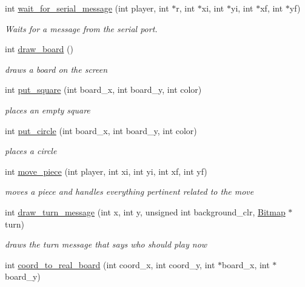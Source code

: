 \begin{DoxyCompactItemize}
int \hyperlink{group___checkers_ga17180b891d06475062d87e08d01af278}{wait\+\_\+for\+\_\+serial\+\_\+message} (int player, int $\ast$r, int $\ast$xi, int $\ast$yi, int $\ast$xf, int $\ast$yf)
\begin{DoxyCompactList}\small\item\em Waits for a message from the serial port. \end{DoxyCompactList}\item 
int \hyperlink{group___checkers_gaa6a495a94944bda567df909f84c62396}{draw\+\_\+board} ()
\begin{DoxyCompactList}\small\item\em draws a board on the screen \end{DoxyCompactList}\item 
int \hyperlink{group___checkers_gaf3fd6677c55727d50220875a0031230b}{put\+\_\+square} (int board\+\_\+x, int board\+\_\+y, int color)
\begin{DoxyCompactList}\small\item\em places an empty square \end{DoxyCompactList}\item 
int \hyperlink{group___checkers_ga1d2d36062ce4e9fcdba43dfdc59215d0}{put\+\_\+circle} (int board\+\_\+x, int board\+\_\+y, int color)
\begin{DoxyCompactList}\small\item\em places a circle \end{DoxyCompactList}\item 
int \hyperlink{group___checkers_gaa0642fe5ef48cc14ab51722047092f1f}{move\+\_\+piece} (int player, int xi, int yi, int xf, int yf)
\begin{DoxyCompactList}\small\item\em moves a piece and handles everything pertinent related to the move \end{DoxyCompactList}\item 
int \hyperlink{group___checkers_ga01bdfba712e2ceab4902f5cd63f6b482}{draw\+\_\+turn\+\_\+message} (int x, int y, unsigned int background\+\_\+clr, \hyperlink{struct_bitmap}{Bitmap} $\ast$turn)
\begin{DoxyCompactList}\small\item\em draws the turn message that says who should play now \end{DoxyCompactList}\item 
int \hyperlink{group___checkers_gae4a0f98e772d41a53d13748a7d9d1252}{coord\+\_\+to\+\_\+real\+\_\+board} (int coord\+\_\+x, int coord\+\_\+y, int $\ast$board\+\_\+x, int $\ast$board\+\_\+y)

\end{DoxyCompactItemize}
